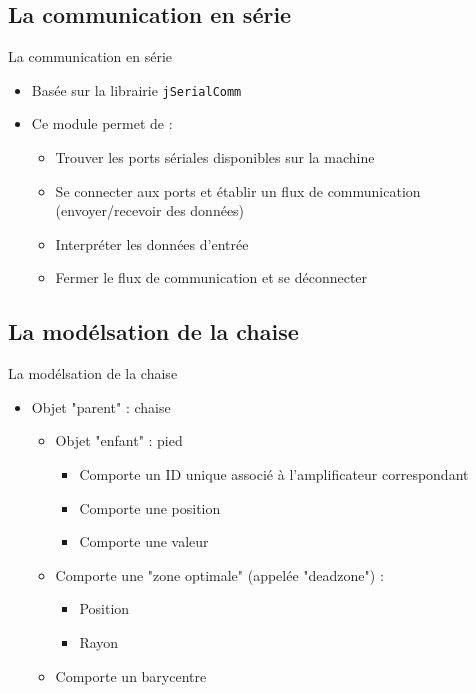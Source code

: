 \documentclass{beamer}
\begin{document}
\subsection{La communication en série}
\begin{frame}
\begin{block}{La communication en série}
\pause
\begin{itemize}
\item Basée sur la librairie \texttt{jSerialComm}
\pause
\item Ce module permet de :
\pause
\begin{itemize}
\item Trouver les ports sériales disponibles sur la machine
\pause
\item Se connecter aux ports et établir un flux de communication (envoyer/recevoir des données)
\pause
\item Interpréter les données d'entrée
\pause
\item Fermer le flux de communication et se déconnecter
\end{itemize}
\end{itemize}
\end{block}
\end{frame}

\subsection{La modélsation de la chaise}
\begin{frame}
\begin{block}{La modélsation de la chaise}
\pause
\begin{itemize}
\item Objet "parent" : chaise
\pause
\begin{itemize}
\item Objet "enfant" : pied
\pause
\begin{itemize}
\item Comporte un ID unique associé à l'amplificateur correspondant
\pause
\item Comporte une position
\pause
\item Comporte une valeur
\end{itemize}
\item Comporte une "zone optimale" (appelée "deadzone") :
\pause
\begin{itemize}
\item Position
\pause
\item Rayon
\pause
\end{itemize}
\item Comporte un barycentre
\end{itemize}
\end{itemize}
\end{block}
\end{frame}
\end{document}
